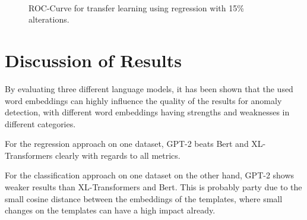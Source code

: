 \begin{figure*}[ht!]
\hspace{\fill}
\hspace{\fill}
   \\
\caption{\label{fig:results_transfer_multiclass_roc}ROC-Curve for transfer learning using regression with 15\% alterations.}
\end{figure*}



\section{Discussion of Results\label{sec:discussion_results}}
By evaluating three different language models, it has been shown that the used word embeddings can highly influence the quality of the results for anomaly detection, with different word embeddings having strengths and weaknesses in different categories. 

\begin{comment}
For anomaly detection on one dataset using the regression approach, GPT-2 shows strong results, with F1-Scores of 0.95 when altering 5\% of log sequences, and 0.93 when altering the log lines, the quality of the results don't degrade much, when alteration ratios are increased, where Bert and XL-Transformers show decreases of 0.1 to 0.2 percentage points when increasing the alteration ratio from 5\% to 15\%. Yet, when the log events are completely reversed, GPT-2 achieves an F1-Score of only 0.55, where Bert and XL achieve 0.98, almost perfectly detecting the wrong sequence of log events.
\end{comment}

For the regression approach on one dataset, GPT-2 beats Bert and XL-Transformers clearly with regards to all metrics.

For the classification approach on one dataset on the other hand, GPT-2 shows weaker results than XL-Transformers and Bert. This is probably party due to the small cosine distance between the embeddings of the templates, where small changes on the templates can have a high impact already.


